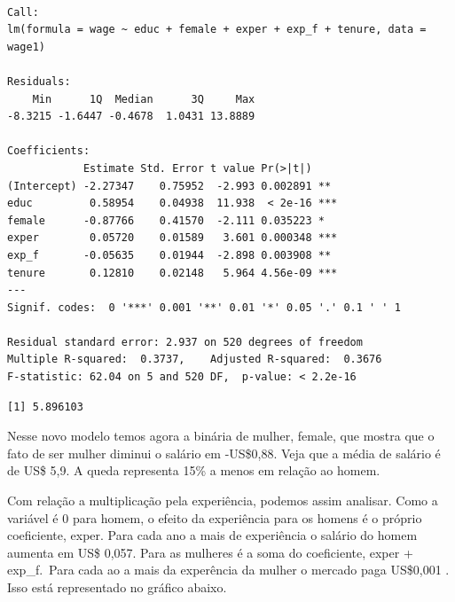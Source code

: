 \documentclass[
  letterpaper,
  DIV=11,
  numbers=noendperiod]{scrreprt}
\newenvironment{Shaded}{\begin{snugshade}}{\end{snugshade}}
\newcommand{\FunctionTok}[1]{\textcolor[rgb]{0.28,0.35,0.67}{#1}}
\newcommand{\NormalTok}[1]{\textcolor[rgb]{0.00,0.23,0.31}{#1}}
\newcommand{\SpecialCharTok}[1]{\textcolor[rgb]{0.37,0.37,0.37}{#1}}
\begin{document}
\begin{verbatim}

Call:
lm(formula = wage ~ educ + female + exper + exp_f + tenure, data = wage1)

Residuals:
    Min      1Q  Median      3Q     Max 
-8.3215 -1.6447 -0.4678  1.0431 13.8889 

Coefficients:
            Estimate Std. Error t value Pr(>|t|)    
(Intercept) -2.27347    0.75952  -2.993 0.002891 ** 
educ         0.58954    0.04938  11.938  < 2e-16 ***
female      -0.87766    0.41570  -2.111 0.035223 *  
exper        0.05720    0.01589   3.601 0.000348 ***
exp_f       -0.05635    0.01944  -2.898 0.003908 ** 
tenure       0.12810    0.02148   5.964 4.56e-09 ***
---
Signif. codes:  0 '***' 0.001 '**' 0.01 '*' 0.05 '.' 0.1 ' ' 1

Residual standard error: 2.937 on 520 degrees of freedom
Multiple R-squared:  0.3737,    Adjusted R-squared:  0.3676 
F-statistic: 62.04 on 5 and 520 DF,  p-value: < 2.2e-16
\end{verbatim}

\begin{Shaded}
\end{Shaded}

\begin{verbatim}
[1] 5.896103
\end{verbatim}

Nesse novo modelo temos agora a binária de mulher, female, que mostra
que o fato de ser mulher diminui o salário em -US\$0,88. Veja que a
média de salário é de US\$ 5,9. A queda representa 15\% a menos em
relação ao homem.

Com relação a multiplicação pela experiência, podemos assim analisar.
Como a variável é 0 para homem, o efeito da experiência para os homens é
o próprio coeficiente, exper. Para cada ano a mais de experiência o
salário do homem aumenta em US\$ 0,057. Para as mulheres é a soma do
coeficiente, exper + exp\_f.~Para cada ao a mais da experência da mulher
o mercado paga US\$0,001 . Isso está representado no gráfico abaixo.
\end{document}
